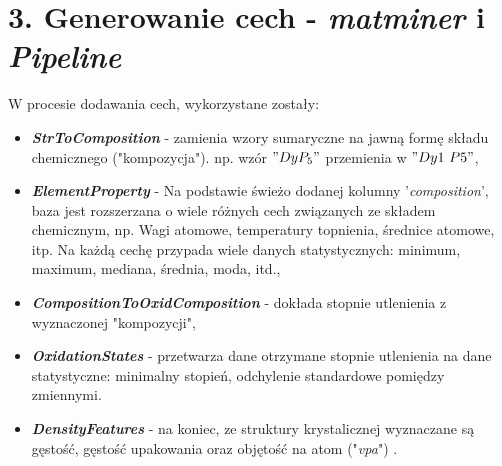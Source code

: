 {}
\justify
\fontsize{14}{16}\selectfont
\setlength{\parindent}{0pt}
\section*{3. Generowanie cech - \textit{matminer} \cite{wardagrawalchoudarywolverton2016, demlohayrewolvertonstevanovic2016, ward2018matminer} i \textit{Pipeline} \cite{scikitlearn}} 
\fontsize{12}{14}\selectfont


W procesie dodawania cech, wykorzystane zostały:
\begin{itemize}
    \item {\textit{\textbf{StrToComposition}} - zamienia wzory sumaryczne na jawną formę składu chemicznego ("kompozycja"). np. wzór $"DyP_5"$ przemienia w $"Dy1\ P5"$},
    
    \item {\textit{\textbf{ElementProperty}} - Na podstawie świeżo dodanej kolumny '\textit{composition}', baza jest rozszerzana o wiele różnych cech związanych ze składem chemicznym, np. Wagi atomowe, temperatury topnienia, średnice atomowe, itp. Na każdą cechę przypada wiele danych statystycznych: minimum, maximum, mediana, średnia, moda, itd.},
    
    \item {\textit{\textbf{CompositionToOxidComposition}} - dokłada stopnie utlenienia z wyznaczonej "kompozycji",}
    
    \item {\textit{\textbf{OxidationStates}} - przetwarza dane otrzymane stopnie utlenienia na dane statystyczne: minimalny stopień, odchylenie standardowe pomiędzy zmiennymi. }
    
    \item {\textit{\textbf{DensityFeatures}} - na koniec, ze struktury krystalicznej wyznaczane są gęstość, gęstość upakowania oraz objętość na atom ("\textit{vpa}") .}
\end{itemize}

